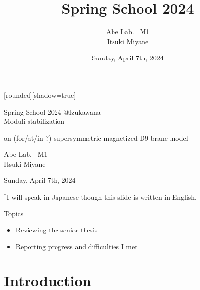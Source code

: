 \documentclass[
  unicode,a4paper,10pt,
  xcolor = {dvipsnames,svgnames},
  hyperref ={colorlinks=true,citecolor=Navy,linkcolor=NavyBlue,urlcolor=purple},
  ja=standard,lualatex
]{beamer}
\title{
  Spring School 2024
}
\author{
  Abe Lab. \ M1
  \texorpdfstring{\\}{}
  \texorpdfstring{\vspace*{3pt}}{}
  Itsuki Miyane
}
\date{Sunday, April 7th, 2024}
\begin{document}
\begin{frame}

  [rounded][shadow=true]

  \begin{block}{}
    \centering
    Spring School 2024 @Izukawana
    \\
    \Large
    Moduli stabilization

    on (for/at/in ?) supersymmetric magnetized D9-brane model
  \end{block}

  \begin{center}
    Abe Lab. \ M1 \\
    Itsuki Miyane

    \vspace*{5pt}

    Sunday, April 7th, 2024
  \end{center}

  \begin{center}
    $^{\ast}$I will speak in Japanese though this slide is written in English.
  \end{center}
\end{frame}

\begin{frame}{Topics}
  \begin{itemize}
    \item
          Reviewing the senior thesis
    \item
          Reporting progress and difficulties I met
  \end{itemize}
\end{frame}


\section{Introduction}

\begin{frame}
  \huge \secname
\end{frame}
\end{document}
